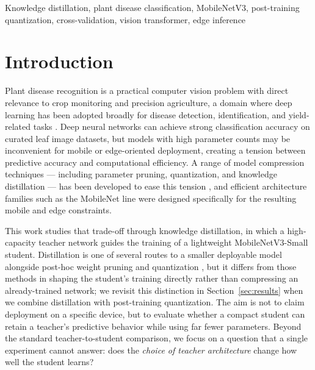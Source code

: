 \documentclass[conference]{IEEEtran}
\begin{document}
\begin{IEEEkeywords}
Knowledge distillation, plant disease classification, MobileNetV3,
post-training quantization, cross-validation, vision transformer, edge inference
\end{IEEEkeywords}

\section{Introduction}

Plant disease recognition is a practical computer vision problem with direct
relevance to crop monitoring and precision agriculture, a domain where deep
learning has been adopted broadly for disease detection, identification, and
yield-related tasks \cite{kamilaris2018deep}. Deep neural networks can achieve
strong classification accuracy on curated leaf image datasets, but models with
high parameter counts may be inconvenient for mobile or edge-oriented
deployment, creating a tension between predictive accuracy and computational
efficiency. A range of model compression techniques --- including parameter
pruning, quantization, and knowledge distillation --- has been developed to
ease this tension \cite{cheng2018model}, and efficient architecture families
such as the MobileNet line \cite{sandler2018mobilenetv2} were designed
specifically for the resulting mobile and edge constraints.

This work studies that trade-off through knowledge distillation, in which a
high-capacity teacher network guides the training of a lightweight
MobileNetV3-Small student. Distillation is one of several routes to a smaller
deployable model alongside post-hoc weight pruning and quantization
\cite{han2016compression}, but it differs from those methods in shaping the
student's training directly rather than compressing an already-trained
network; we revisit this distinction in Section~\ref{sec:results} when we
combine distillation with post-training quantization. The aim is not to claim
deployment on a specific device, but to evaluate whether a compact student can
retain a teacher's predictive behavior while using far fewer parameters.
Beyond the standard teacher-to-student comparison, we focus on a question that
a single experiment cannot answer: does the \emph{choice of teacher
architecture} change how well the student learns?
\end{document}
